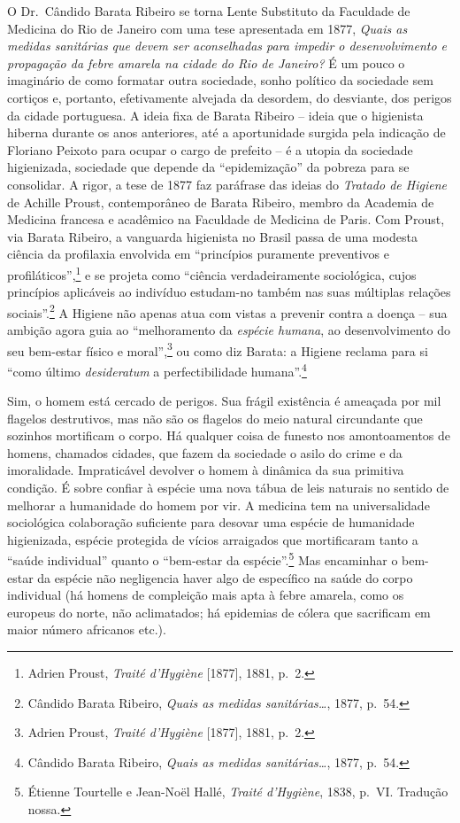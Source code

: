 O Dr.~Cândido Barata Ribeiro se torna Lente Substituto da Faculdade de
Medicina do Rio de Janeiro com uma tese apresentada em 1877, \emph{Quais
as medidas sanitárias que devem ser aconselhadas para impedir o
desenvolvimento e propagação da febre amarela na cidade do Rio de
Janeiro?} É um pouco o imaginário de como formatar outra sociedade,
sonho político da sociedade sem cortiços e, portanto, efetivamente
alvejada da desordem, do desviante, dos perigos da cidade portuguesa. A
ideia fixa de Barata Ribeiro -- ideia que o higienista hiberna durante
os anos anteriores, até a aportunidade surgida pela indicação de
Floriano Peixoto para ocupar o cargo de prefeito -- é a utopia da
sociedade higienizada, sociedade que depende da ``epidemização'' da
pobreza para se consolidar. A rigor, a tese de 1877 faz paráfrase das
ideias do \emph{Tratado de Higiene} de Achille Proust, contemporâneo de
Barata Ribeiro, membro da Academia de Medicina francesa e acadêmico na
Faculdade de Medicina de Paris. Com Proust, via Barata Ribeiro, a
vanguarda higienista no Brasil passa de uma modesta ciência da
profilaxia envolvida em ``princípios puramente preventivos e
profiláticos'',\footnote{Adrien Proust, \emph{Traité d'Hygiène}
  {[}1877{]}, 1881, p.~2.} e se projeta como ``ciência verdadeiramente
sociológica, cujos princípios aplicáveis ao indivíduo estudam-no também
nas suas múltiplas relações sociais''.\footnote{Cândido Barata Ribeiro,
  \emph{Quais as medidas sanitárias\ldots{}}, 1877, p.~54.} A Higiene
não apenas atua com vistas a prevenir contra a doença -- sua ambição
agora guia ao ``melhoramento da \emph{espécie humana}, ao
desenvolvimento do seu bem-estar físico e moral'',\footnote{Adrien
  Proust, \emph{Traité d'Hygiène} {[}1877{]}, 1881, p.~2.} ou como diz
Barata: a Higiene reclama para si ``como último \emph{desideratum} a
perfectibilidade humana''.\footnote{Cândido Barata Ribeiro, \emph{Quais
  as medidas sanitárias\ldots{}}, 1877, p.~54.}

Sim, o homem está cercado de perigos. Sua frágil existência é ameaçada
por mil flagelos destrutivos, mas não são os flagelos do meio natural
circundante que sozinhos mortificam o corpo. Há qualquer coisa de
funesto nos amontoamentos de homens, chamados cidades, que fazem da
sociedade o asilo do crime e da imoralidade. Impraticável devolver o
homem à dinâmica da sua primitiva condição. É sobre confiar à espécie
uma nova tábua de leis naturais no sentido de melhorar a humanidade do
homem por vir. A medicina tem na universalidade sociológica colaboração
suficiente para desovar uma espécie de humanidade higienizada, espécie
protegida de vícios arraigados que mortificaram tanto a ``saúde
individual'' quanto o ``bem-estar da espécie''.\footnote{Étienne
  Tourtelle e Jean-Noël Hallé, \emph{Traité d'Hygiène}, 1838, p.~VI.
  Tradução nossa.} Mas encaminhar o bem-estar da espécie não negligencia
haver algo de específico na saúde do corpo individual (há homens de
compleição mais apta à febre amarela, como os europeus do norte, não
aclimatados; há epidemias de cólera que sacrificam em maior número
africanos etc.).

